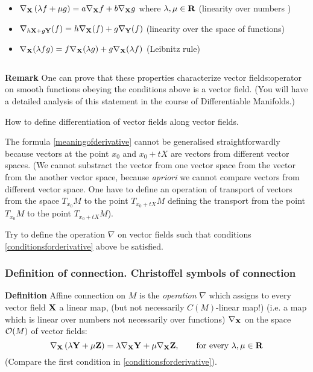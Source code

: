 \documentclass[12pt]{article}
\theoremstyle{theorem}
\numberwithin{equation}{section}
\begin{document}
\begin{itemize}
\item
   $\nabla_{{\bf X}}\left(\lambda f+\mu g\right)=
   a\nabla_{{\bf X}}f+b\nabla_{{\bf X}}g$
 where $\lambda,\mu\in {\bf R}$ (linearity over numbers )

\item
 $\nabla_{h{\bf X}+g\bf Y}(f)=h\nabla_{{\bf X}}(f)+g\nabla_{\bf Y}(f)$
                   (linearity over the space of functions)


\item

  $\nabla_{\bf X}(\lambda fg)=f\nabla_{\bf X}(\lambda g)+g\nabla_{\bf X}(\lambda f)$                       (Leibnitz rule)

\begin{equation}\label{conditionsforderivative}
\end{equation}

\end{itemize}

{\bf Remark}
One can prove that these properties characterize  vector fields:operator on smooth functions
obeying the conditions above is a vector field.
(You will have a detailed analysis of this statement in the course of Differentiable Manifolds.)

\m

How to define differentiation of vector fields along vector fields.

The formula \eqref{meaningofderivative} cannot be generalised straightforwardly because
vectors at the point $x_0$ and $x_0+t X$ are vectors from different vector spaces.
(We cannot substract the vector from one vector space from the
vector from the another vector space, because {\it apriori}
we cannot compare vectors from different vector space.
One have to define an operation of transport of vectors from the space
$T_{x_0}M$ to the point $T_{x_0+tX}M$ defining the transport
from the point $T_{x_0}M$ to the point $T_{x_0+tX}M$).

Try to define the operation $\nabla$ on vector fields such
that conditions \eqref{conditionsforderivative} above  be satisfied.



\subsubsection{Definition of connection. Christoffel symbols of connection}

{\bf Definition} Affine connection on $M$ is the {\it operation} $\nabla$
which assigns to every vector field $\bf X$ a linear map, (but not necessarily $C(M)$-linear map!)
(i.e. a map which is linear over numbers not necessarily over functions)
 $\nabla_{\bf X}$
 on the space ${\cal O}(M)$ of
vector fields:
\begin{equation}\label{defofconnection}
  \nabla_{\bf X}\left(\lambda{\bf Y}+\mu{\bf Z}\right)=
   \lambda\nabla_{\bf X}{\bf Y}+\mu\nabla_{\bf X}{\bf Z},\qquad
   \hbox{for every $\lambda,\mu\in {\bf R}$}
\end{equation}
(Compare the first condition in \eqref{conditionsforderivative}).
\end{document}
